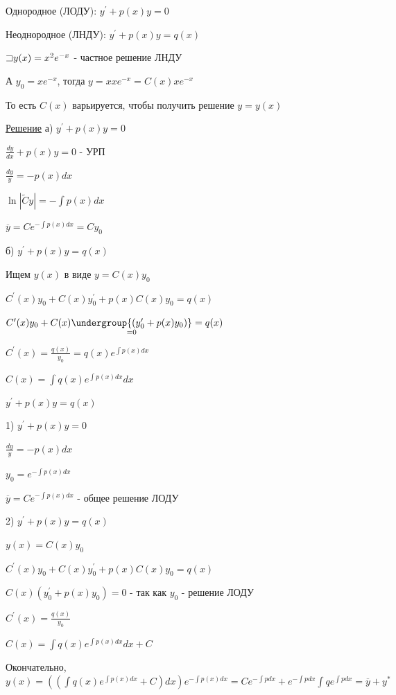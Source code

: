 \documentclass[12pt]{article}
\begin{document}
    \Def Однородное (ЛОДУ): $y^\prime + p(x)y = 0$

    \Def Неоднородное (ЛНДУ): $y^\prime + p(x)y = q(x)$

    \Ex $\mathord{\sqsupset} y(x) = x^2 e^{-x}$ - частное решение ЛНДУ

    А $y_0 = x e^{-x}$, тогда $y = x xe^{-x} = C(x) x e^{-x}$

    То есть $C(x)$ варьируется, чтобы получить решение $y = y(x)$

    \underline{Решение} а) $y^\prime + p(x)y = 0$

    $\frac{dy}{dx} + p(x)y = 0$ - УРП

    $\frac{dy}{y} = -p(x)dx$

    $\ln|\tilde{C}y| = -\int p(x)dx$

    $\overline{y} = Ce^{-\int p(x) dx} = Cy_0$

    б) $y^\prime + p(x)y = q(x)$

    Ищем $y(x)$ в виде $y = C(x)y_0$

    $C^\prime(x)y_0 + C(x)y^\prime_0 + p(x)C(x)y_0 = q(x)$

    $C^\prime(x)y_0 + C(x)\underset{=0}{\undergroup{(y^\prime_0 + p(x)y_0)}} = q(x)$

    $C^\prime(x) = \frac{q(x)}{y_0} = q(x)e^{\int p(x)dx}$

    $C(x) = \int q(x) e^{\int p(x)dx} dx$



    \Mem $y^\prime + p(x)y = q(x)$

    1) $y^\prime + p(x)y = 0$

    $\frac{dy}{y} = -p(x)dx$

    $y_0 = e^{-\int p(x)dx}$

    $\overline{y} = Ce^{-\int p(x)dx}$ - общее решение ЛОДУ

    2) $y^\prime + p(x)y = q(x)$

    $y(x) = C(x)y_0$

    $C^\prime(x)y_0 + C(x)y^\prime_0 + p(x)C(x)y_0 = q(x)$

    $C(x)(y_0^\prime + p(x)y_0) = 0$ - так как $y_0$ - решение ЛОДУ

    $C^\prime(x) = \frac{q(x)}{y_0}$

    $C(x) = \int q(x)e^{\int p(x)dx} dx + C$

    Окончательно, $y(x) = \left(\left(\int q(x) e^{\int p(x)dx} + C\right) dx\right) e^{-\int p(x) dx} =
    Ce^{-\int p dx} + e^{-\int pdx} \int q e^{\int p dx} = \overline{y} + y^*$
\end{document}
